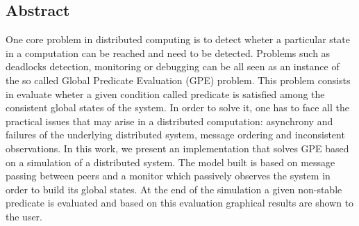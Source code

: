 \begin{titlepage}
\section*{Abstract}

One core problem in distributed computing is to detect wheter a particular state in a computation can be reached and need to be detected. Problems such as deadlocks detection, monitoring or debugging can be all seen as an instance of the so called Global Predicate Evaluation (GPE) problem. This problem consists in evaluate wheter a given condition called predicate is satisfied among the consistent global states of the system. In order to solve it, one has to face all the practical issues that may arise in a distributed computation: asynchrony and failures of the underlying distributed system, message ordering and inconsistent observations. In this work, we present an implementation that solves GPE based on a simulation of a distributed system. The model built is based on message passing between peers and a monitor which passively observes the system in order to build its global states. At the end of the simulation a given non-stable predicate is evaluated and based on this evaluation graphical results are shown to the user.

\end{titlepage}

